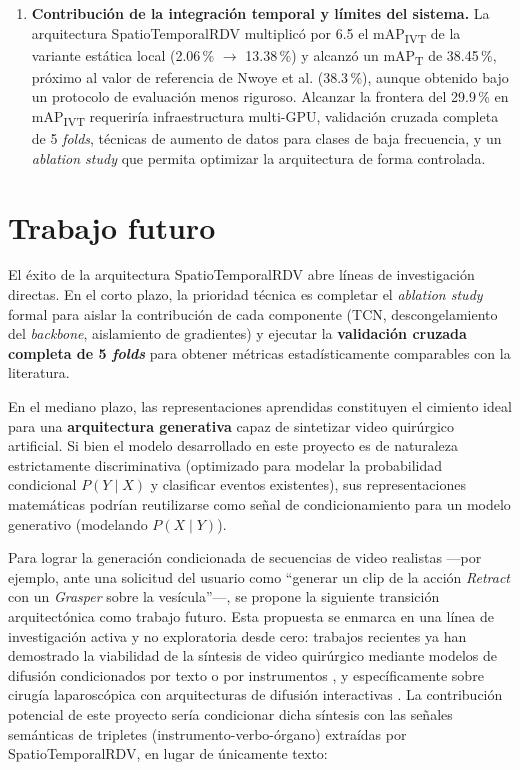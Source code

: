 \documentclass[11pt]{article}
\begin{document}
\begin{enumerate}[leftmargin=1.6em]
    \item \textbf{Contribución de la integración temporal y límites del sistema.} La arquitectura SpatioTemporalRDV multiplicó por 6.5 el mAP\textsubscript{IVT} de la variante estática local (2.06\,\% $\rightarrow$ 13.38\,\%) y alcanzó un mAP\textsubscript{T} de 38.45\,\%, próximo al valor de referencia de Nwoye et al. \cite{nwoye2022rendezvous} (38.3\,\%), aunque obtenido bajo un protocolo de evaluación menos riguroso. Alcanzar la frontera del 29.9\,\% en mAP\textsubscript{IVT} requeriría infraestructura multi-GPU, validación cruzada completa de 5 \emph{folds}, técnicas de aumento de datos para clases de baja frecuencia, y un \emph{ablation study} que permita optimizar la arquitectura de forma controlada.
\end{enumerate}

\section{Trabajo futuro}
\label{sec:trabajo-futuro}

El éxito de la arquitectura SpatioTemporalRDV abre líneas de investigación directas. En el corto plazo, la prioridad técnica es completar el \emph{ablation study} formal para aislar la contribución de cada componente (TCN, descongelamiento del \emph{backbone}, aislamiento de gradientes) y ejecutar la \textbf{validación cruzada completa de 5 \emph{folds}} para obtener métricas estadísticamente comparables con la literatura.

En el mediano plazo, las representaciones aprendidas constituyen el cimiento ideal para una \textbf{arquitectura generativa} capaz de sintetizar video quirúrgico artificial. Si bien el modelo desarrollado en este proyecto es de naturaleza estrictamente discriminativa (optimizado para modelar la probabilidad condicional $P(Y\mid X)$ y clasificar eventos existentes), sus representaciones matemáticas podrían reutilizarse como señal de condicionamiento para un modelo generativo (modelando $P(X\mid Y)$).

Para lograr la generación condicionada de secuencias de video realistas —por ejemplo, ante una solicitud del usuario como ``generar un clip de la acción \emph{Retract} con un \emph{Grasper} sobre la vesícula''—, se propone la siguiente transición arquitectónica como trabajo futuro. Esta propuesta se enmarca en una línea de investigación activa y no exploratoria desde cero: trabajos recientes ya han demostrado la viabilidad de la síntesis de video quirúrgico mediante modelos de difusión condicionados por texto o por instrumentos \cite{cho2024surgen}, y específicamente sobre cirugía laparoscópica con arquitecturas de difusión interactivas \cite{iliash2025interactive}. La contribución potencial de este proyecto sería condicionar dicha síntesis con las señales semánticas de tripletes (instrumento-verbo-órgano) extraídas por SpatioTemporalRDV, en lugar de únicamente texto:
\end{document}
